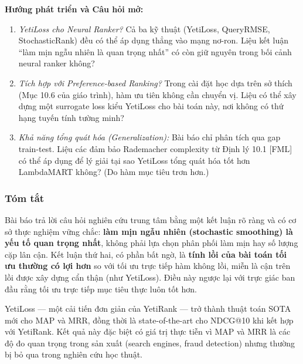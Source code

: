 \begin{tcolorbox}\textbf{Hướng phát triển và Câu hỏi mở:}\bfseries
  \begin{enumerate}
    \item \textit{YetiLoss cho Neural Ranker?} Cả ba kỹ thuật (YetiLoss, QueryRMSE, StochasticRank) đều có thể áp dụng thẳng vào mạng nơ-ron. Liệu kết luận ``làm mịn ngẫu nhiên là quan trọng nhất'' có còn giữ nguyên trong bối cảnh neural ranker không?
    \item \textit{Tích hợp với Preference-based Ranking?} Trong cài đặt học dựa trên sở thích (Mục 10.6 của giáo trình), hàm ưu tiên không cần chuyển vị. Liệu có thể xây dựng một surrogate loss kiểu YetiLoss cho bài toán này, nơi không có thứ hạng tuyến tính tường minh?
    \item \textit{Khả năng tổng quát hóa (Generalization):} Bài báo chỉ phân tích qua gap train-test. Liệu các đảm bảo Rademacher complexity từ Định lý 10.1 [FML] có thể áp dụng để lý giải tại sao YetiLoss tổng quát hóa tốt hơn LambdaMART không? (Do hàm mục tiêu trơn hơn.)
  \end{enumerate}
\end{tcolorbox}

\subsubsection{Tóm tắt}
Bài báo trả lời câu hỏi nghiên cứu trung tâm bằng một kết luận rõ ràng và có cơ sở thực nghiệm vững chắc: \textbf{làm mịn ngẫu nhiên (stochastic smoothing) là yếu tố quan trọng nhất}, không phải lựa chọn phân phối làm mịn hay số lượng cặp lân cận. Kết luận thứ hai, có phần bất ngờ, là \textbf{tính lồi của bài toán tối ưu thường có lợi hơn} so với tối ưu trực tiếp hàm không lồi, miễn là cận trên lồi được xây dựng cẩn thận (như YetiLoss). Điều này ngược lại với trực giác ban đầu rằng tối ưu trực tiếp mục tiêu thực luôn tốt hơn.

YetiLoss --- một cải tiến đơn giản của YetiRank --- trở thành thuật toán SOTA mới cho MAP và MRR, đồng thời là state-of-the-art cho NDCG@10 khi kết hợp với YetiRank. Kết quả này đặc biệt có giá trị thực tiễn vì MAP và MRR là các độ đo quan trọng trong sản xuất (search engines, fraud detection) nhưng thường bị bỏ qua trong nghiên cứu học thuật.
